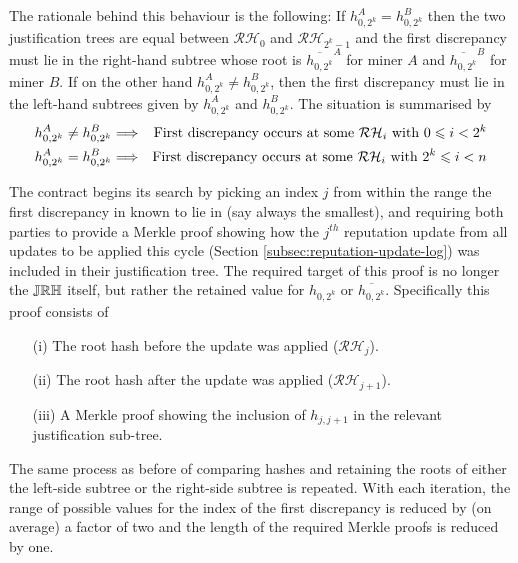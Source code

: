 The rationale behind this behaviour is the following: If $h_{0,2^k}^A = h_{0,2^k}^B$ then the two justification trees are equal between $\mathcal{RH}_0$ and $\mathcal{RH}_{2^k-1}$ and the first discrepancy must lie in the right-hand subtree whose root is $\overline{h_{0,2^k}}^A$ for miner $A$ and $\overline{h_{0,2^k}}^B$ for miner $B$. If on the other hand $h_{0,2^k}^A \neq h_{0,2^k}^B$, then the first discrepancy must lie in the left-hand subtrees given by $h_{0,2^k}^A$ and $h_{0,2^k}^B$. The situation is summarised by
\begin{eqnarray*}
 h_{0,2^k}^A \neq h_{0,2^k}^B & \Longrightarrow & \textnormal{First discrepancy occurs at some } \mathcal{RH}_i \textnormal{ with } 0 \leqslant i < 2^k\\
 h_{0,2^k}^A = h_{0,2^k}^B & \Longrightarrow & \textnormal{First discrepancy occurs at some } \mathcal{RH}_i \textnormal{ with } 2^k \leqslant i < n
\end{eqnarray*}

The contract begins its search by %
%
picking an index $j$ from within the range the first discrepancy in known to lie in (say always the smallest), and requiring both parties to provide a Merkle proof showing how the $j^{th}$ reputation update from all updates to be applied this cycle (Section \ref{subsec:reputation-update-log}) was included in their justification tree. The required target of this proof is no longer the $\mathbb{JRH}$ itself, but rather the retained value for $h_{0,2^k}$ or $\overline{h_{0,2^k}}$. Specifically this proof consists of

\begin{itemize}
 \item[(i)] The root hash before the update was applied ($\mathcal{RH}_{j}$).
 \item[(ii)] The root hash after the update was applied ($\mathcal{RH}_{j+1}$).
 \item[(iii)] A Merkle proof showing the inclusion of $h_{j,j+1}$ in the relevant justification sub-tree.
\end{itemize}

The same process as before of comparing hashes and retaining the roots of either the left-side subtree or the right-side subtree is repeated. With each iteration, the range of possible values for the index of the first discrepancy is reduced by (on average) a factor of two and the length of the required Merkle proofs is reduced by one.

